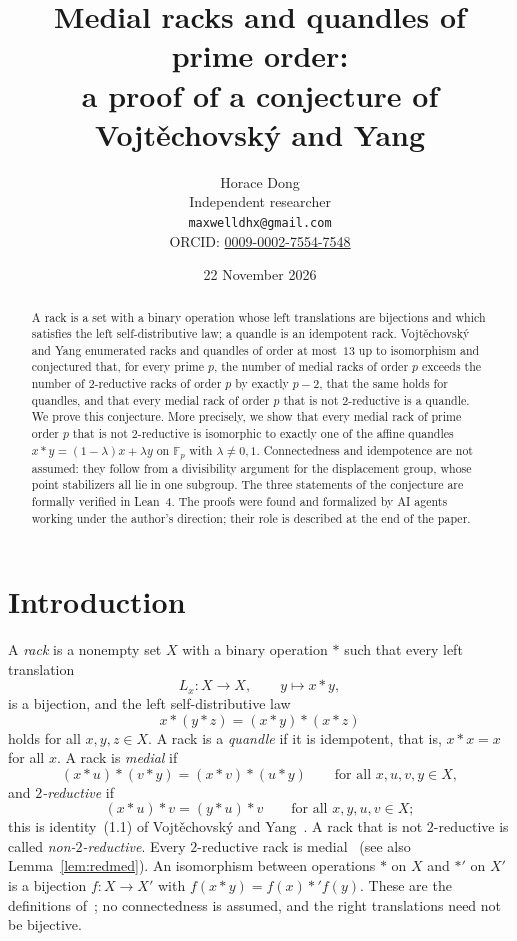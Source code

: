 \documentclass[11pt]{article}
\title{Medial racks and quandles of prime order:\\ a proof of a conjecture of Vojt\v{e}chovsk\'y and Yang}
\author{Horace Dong\\ \small Independent researcher\\
\small\texttt{maxwelldhx@gmail.com}\\
\small ORCID: \href{https://orcid.org/0009-0002-7554-7548}{0009-0002-7554-7548}}
\date{22 November 2026}
\theoremstyle{definition}
\theoremstyle{remark}
\newcommand{\F}{\mathbb F}
\begin{document}
\maketitle

\begin{abstract}
A rack is a set with a binary operation whose left translations are
bijections and which satisfies the left self-distributive law; a quandle is an
idempotent rack. Vojt\v{e}chovsk\'y and Yang enumerated racks and quandles of
order at most~$13$ up to isomorphism and conjectured that, for every prime
$p$, the number of medial racks of order $p$ exceeds the number of
$2$-reductive racks of order $p$ by exactly $p-2$, that the same holds for
quandles, and that every medial rack of order $p$ that is not $2$-reductive is
a quandle. We prove this conjecture. More precisely, we show that every medial
rack of prime order $p$ that is not $2$-reductive is isomorphic to exactly one
of the affine quandles $x*y=(1-\lambda)x+\lambda y$ on $\F_p$ with
$\lambda\ne0,1$. Connectedness and idempotence are not assumed: they follow
from a divisibility argument for the displacement group, whose point
stabilizers all lie in one subgroup. The three statements of the conjecture
are formally verified in Lean~4. The proofs were found and formalized by AI
agents working under the author's direction; their role is described at the
end of the paper.
\end{abstract}

\section{Introduction}

A \emph{rack} is a nonempty set $X$ with a binary operation $*$ such that every
left translation
\[
L_x\colon X\to X,\qquad y\mapsto x*y ,
\]
is a bijection, and the left self-distributive law
\[
x*(y*z)=(x*y)*(x*z)
\]
holds for all $x,y,z\in X$. A rack is a \emph{quandle} if it is idempotent,
that is, $x*x=x$ for all $x$. A rack is \emph{medial} if
\[
(x*u)*(v*y)=(x*v)*(u*y)\qquad\text{for all }x,u,v,y\in X,
\]
and \emph{$2$-reductive} if
\begin{equation}\label{eq:2red}
(x*u)*v=(y*u)*v\qquad\text{for all }x,y,u,v\in X ;
\end{equation}
this is identity~(1.1) of Vojt\v{e}chovsk\'y and Yang~\cite[p.~2]{vy}. A rack
that is not $2$-reductive is called \emph{non-$2$-reductive}. Every
$2$-reductive rack is medial~\cite[p.~2]{vy} (see also Lemma~\ref{lem:redmed}).
An isomorphism between operations $*$ on $X$ and $*'$ on $X'$ is a bijection
$f\colon X\to X'$ with $f(x*y)=f(x)*'f(y)$. These are the definitions
of~\cite[Section~1]{vy}; no connectedness is assumed, and the right
translations need not be bijective.
\end{document}
